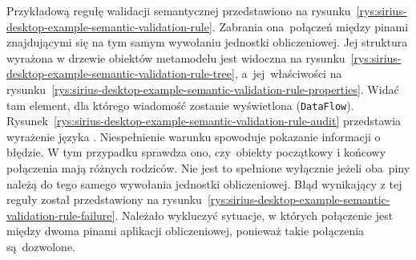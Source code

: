 Przykładową regułę walidacji semantycznej przedstawiono na
rysunku~\ref{rys:sirius-desktop-example-semantic-validation-rule}.
Zabrania ona~połączeń między pinami znajdującymi się na tym samym wywołaniu
jednostki obliczeniowej. Jej struktura wyrażona w drzewie obiektów metamodelu
jest widoczna na
rysunku~\ref{rys:sirius-desktop-example-semantic-validation-rule-tree},
a~jej~właściwości na
rysunku~\ref{rys:sirius-desktop-example-semantic-validation-rule-properties}.
Widać tam element, dla którego wiadomość zostanie wyświetlona
(\texttt{DataFlow}).
Rysunek~\ref{rys:sirius-desktop-example-semantic-validation-rule-audit}
przedstawia wyrażenie języka \AQL{}. Niespełnienie warunku spowoduje
pokazanie
informacji o błędzie. W tym przypadku sprawdza ono, czy~obiekty początkowy i
końcowy połączenia mają różnych rodziców. Nie jest to spełnione wyłącznie
jeżeli oba~piny należą do tego samego wywołania jednostki obliczeniowej.
Błąd wynikający z tej reguły został
przedstawiony na
rysunku~\ref{rys:sirius-desktop-example-semantic-validation-rule-failure}.
Należało wykluczyć sytuacje, w
których połączenie jest między dwoma pinami aplikacji obliczeniowej, ponieważ
takie połączenia są~dozwolone.

